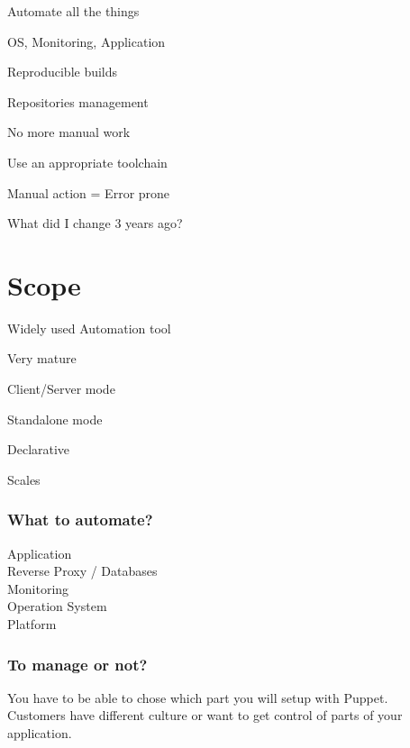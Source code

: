 \begin{iframe}[Automation]
\item Automate all the things
\item OS, Monitoring, Application
\item Reproducible builds
\item Repositories management
\end{iframe}

\begin{iframe}
\item No more manual work
\item Use an appropriate toolchain
\item Manual action = Error prone
\item What did I change 3 years ago?
\end{iframe}


\section{Scope}

\begin{iframe}[Puppet]
\item Widely used Automation tool\pause
\item Very mature\pause
\item Client/Server mode\pause
\item Standalone mode\pause
\item Declarative\pause
\item Scales
\end{iframe}

\begin{frame}
    \frametitle{What to automate?}
    \huge
    Application\\
    Reverse Proxy / Databases\\
    Monitoring\\
    Operation System\\
    Platform
\end{frame}

\begin{frame}
    \frametitle{To manage or not?}
    \huge You have to be able to chose which part you will setup with Puppet.\\\large Customers have different culture or want to get control of parts of your application.
\end{frame}

